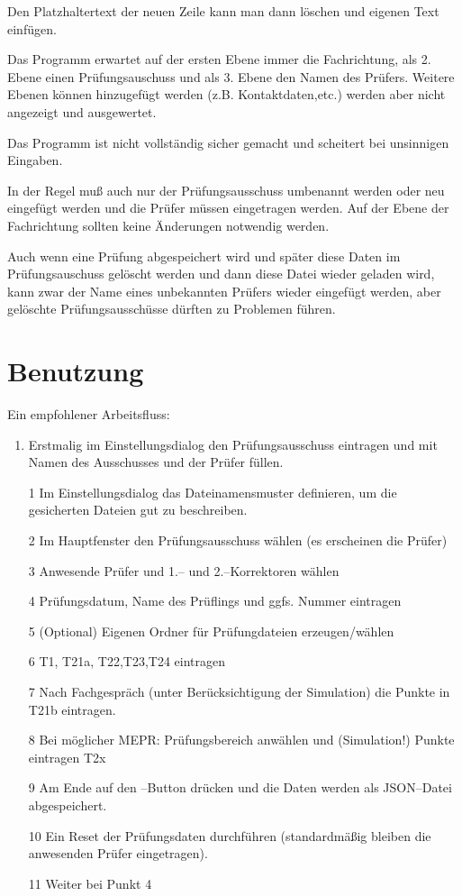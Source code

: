 \documentclass[a4paper,notitlepage,parskip=half]{scrartcl}
\begin{document}
Den Platzhaltertext der neuen Zeile kann man dann löschen und eigenen Text einfügen.

\begin{marker}
Das Programm erwartet auf der ersten Ebene immer die Fachrichtung, als 2. Ebene einen Prüfungsauschuss und als 3. Ebene den Namen des Prüfers. Weitere Ebenen können hinzugefügt werden (z.B. Kontaktdaten,etc.) werden aber nicht angezeigt und ausgewertet.
\end{marker}

Das Programm ist nicht vollständig sicher gemacht und scheitert bei unsinnigen Eingaben.

In der Regel muß auch nur der Prüfungsausschuss umbenannt werden oder neu eingefügt werden und die Prüfer müssen eingetragen werden. Auf der Ebene der Fachrichtung sollten keine Änderungen notwendig werden.

Auch wenn eine Prüfung abgespeichert wird und später diese Daten im Prüfungsauschuss gelöscht werden und dann diese Datei wieder geladen wird, kann zwar der Name eines unbekannten Prüfers wieder eingefügt werden, aber gelöschte Prüfungsausschüsse dürften zu Problemen führen.

\section{Benutzung}

Ein empfohlener Arbeitsfluss:

\begin{enumerate}
\item Erstmalig im Einstellungsdialog den Prüfungsausschuss eintragen und mit Namen des Ausschusses und der Prüfer füllen.
\item[1] Im Einstellungsdialog das Dateinamensmuster definieren, um die gesicherten Dateien gut zu beschreiben.
\item[2] Im Hauptfenster den Prüfungsausschuss wählen (es erscheinen die Prüfer)
\item[3] Anwesende Prüfer und 1.-- und 2.--Korrektoren wählen
\item[4] Prüfungsdatum, Name des Prüflings und ggfs. Nummer eintragen
\item[5] (Optional) Eigenen Ordner für Prüfungdateien erzeugen/wählen
\item[6] T1, T21a, T22,T23,T24 eintragen
\item[7] Nach Fachgespräch (unter Berücksichtigung der Simulation) die Punkte in T21b eintragen.
\item[8] Bei möglicher MEPR: Prüfungsbereich anwählen und (Simulation!) Punkte eintragen T2x
\item[9] Am Ende auf den --Button drücken und die Daten werden als JSON--Datei abgespeichert.
\item[10] Ein Reset der Prüfungsdaten durchführen (standardmäßig bleiben die anwesenden Prüfer eingetragen).
\item[11] Weiter bei Punkt 4
\end{enumerate}
\end{document}
